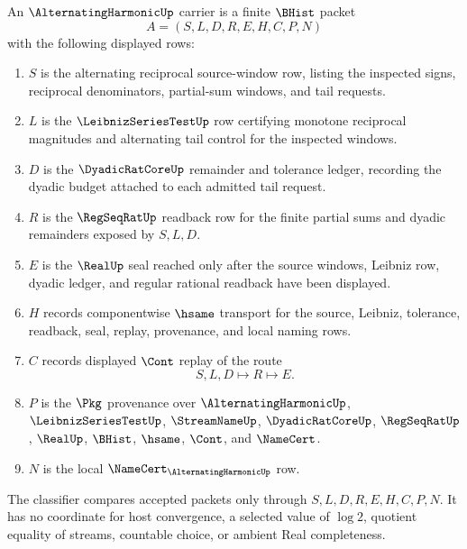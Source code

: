 \begin{definition}
\label{def:alternating-harmonic-carrier}
An $\AlternatingHarmonicUp$ carrier is a finite $\BHist$ packet
$$
A=(S,L,D,R,E,H,C,P,N)
$$
with the following displayed rows:
\begin{enumerate}
\item $S$ is the alternating reciprocal source-window row, listing the inspected signs, reciprocal denominators, partial-sum windows, and tail requests.
\item $L$ is the $\LeibnizSeriesTestUp$ row certifying monotone reciprocal magnitudes and alternating tail control for the inspected windows.
\item $D$ is the $\DyadicRatCoreUp$ remainder and tolerance ledger, recording the dyadic budget attached to each admitted tail request.
\item $R$ is the $\RegSeqRatUp$ readback row for the finite partial sums and dyadic remainders exposed by $S,L,D$.
\item $E$ is the $\RealUp$ seal reached only after the source windows, Leibniz row, dyadic ledger, and regular rational readback have been displayed.
\item $H$ records componentwise $\hsame$ transport for the source, Leibniz, tolerance, readback, seal, replay, provenance, and local naming rows.
\item $C$ records displayed $\Cont$ replay of the route
$$
S,L,D \longmapsto R \longmapsto E .
$$
\item $P$ is the $\Pkg$ provenance over $\AlternatingHarmonicUp$, $\LeibnizSeriesTestUp$, $\StreamNameUp$, $\DyadicRatCoreUp$, $\RegSeqRatUp$, $\RealUp$, $\BHist$, $\hsame$, $\Cont$, and $\NameCert$.
\item $N$ is the local $\NameCert_{\AlternatingHarmonicUp}$ row.
\end{enumerate}
The classifier compares accepted packets only through $S,L,D,R,E,H,C,P,N$. It has no coordinate for host convergence, a selected value of $\log 2$, quotient equality of streams, countable choice, or ambient Real completeness.
\end{definition}

